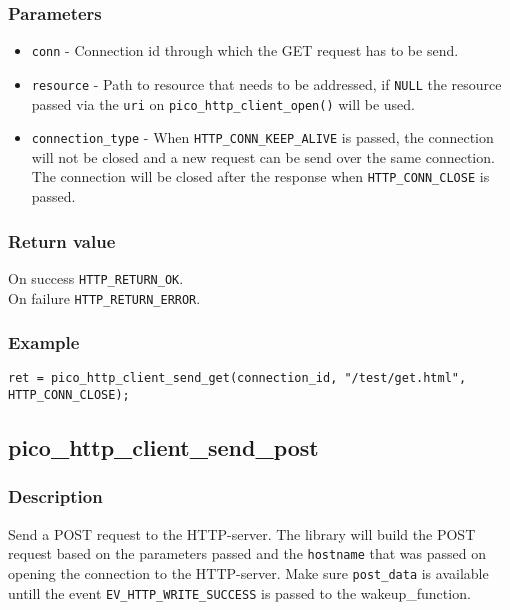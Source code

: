 \subsubsection*{Parameters}
\begin{itemize}[noitemsep]
\item \texttt{conn} - Connection id through which the GET request has to be send.
\item \texttt{resource} - Path to resource that needs to be addressed, if \texttt{NULL} the resource passed via the \texttt{uri} on \texttt{pico\_http\_client\_open()} will be used.
\item \texttt{connection\_type} - When \texttt{HTTP\_CONN\_KEEP\_ALIVE} is passed, the connection will not be closed and a new request can be send over the same connection. The connection will be closed after the response when \texttt{HTTP\_CONN\_CLOSE} is passed.
\end{itemize}

\subsubsection*{Return value}
On success \texttt{HTTP\_RETURN\_OK}.
\\On failure \texttt{HTTP\_RETURN\_ERROR}.

\subsubsection*{Example}
\begin{verbatim}
ret = pico_http_client_send_get(connection_id, "/test/get.html", HTTP_CONN_CLOSE);
\end{verbatim}


\subsection{pico\_http\_client\_send\_post}

\subsubsection*{Description}
Send a POST request to the HTTP-server. The library will build the POST request based on the parameters passed and the \texttt{hostname} that was passed on opening the connection to the HTTP-server. Make sure \texttt{post\_data} is available untill the event \texttt{EV\_HTTP\_WRITE\_SUCCESS} is passed to the wakeup\_function.

